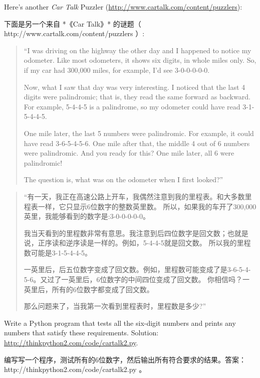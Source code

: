 \begin{exercise}
Here's another {\em Car Talk}
Puzzler (\url{http://www.cartalk.com/content/puzzlers}):

下面是另一个来自 *《Car Talk》* 的谜题（ http://www.cartalk.com/content/puzzlers ）:
  
  

\begin{quote}
``I was driving on the highway the other day and I happened to
notice my odometer. Like most odometers, it shows six digits,
in whole miles only. So, if my car had 300,000
miles, for example, I'd see 3-0-0-0-0-0.

Now, what I saw that day was very interesting. I noticed that the
last 4 digits were palindromic; that is, they read the same forward as
backward. For example, 5-4-4-5 is a palindrome, so my odometer
could have read 3-1-5-4-4-5.

One mile later, the last 5 numbers were palindromic. For example, it
could have read 3-6-5-4-5-6.  One mile after that, the middle 4 out of
6 numbers were palindromic.  And you ready for this? One mile later,
all 6 were palindromic!

The question is, what was on the odometer when I first looked?''
\end{quote}


\begin{quote}
    ``有一天，我正在高速公路上开车，我偶然注意到我的里程表。和大多数里程表一样，它只显示6位数字的整数英里数。
    所以，如果我的车开了300,000英里，我能够看到的数字是:3-0-0-0-0-0。

    我当天看到的里程数非常有意思。我注意到后四位数字是回文数；也就是说，正序读和逆序读是一样的。例如，5-4-4-5就是回文数。
    所以我的里程数可能是3-1-5-4-4-5。

    一英里后，后五位数字变成了回文数。例如，里程数可能变成了是3-6-5-4-5-6。又过了一英里后，6位数字的中间四位变成了回文数。
    你相信吗？一英里后，所有的6位数字都变成了回文数。

    那么问题来了，当我第一次看到里程表时，里程数是多少?''
\end{quote}

Write a Python program that tests all the six-digit numbers and prints
any numbers that satisfy these requirements.
Solution: \url{http://thinkpython2.com/code/cartalk2.py}.

编写写一个程序，测试所有的6位数字，然后输出所有符合要求的结果。答案： http://thinkpython2.com/code/cartalk2.py 。

\end{exercise}


